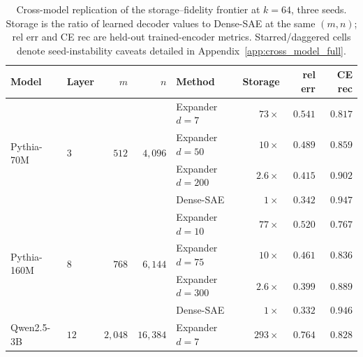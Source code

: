 \documentclass{article}
\theoremstyle{plain}
\theoremstyle{definition}
\theoremstyle{remark}
\begin{document}
\begin{table}[h]
    \centering
    \caption{Cross-model replication of the storage--fidelity frontier at $k{=}64$, three seeds. Storage is the ratio of learned decoder values to Dense-SAE at the same $(m,n)$; rel err and CE rec are held-out trained-encoder metrics. Starred/daggered cells denote seed-instability caveats detailed in Appendix~\ref{app:cross_model_full}.}
    \label{tab:cross_model}
    \small
    \setlength{\tabcolsep}{4pt}
    \begin{tabular}{llrrlrrr}
        \toprule
        Model & Layer & $m$ & $n$ & Method & Storage & rel err & CE rec \\
        \midrule
        \multirow{4}{*}{Pythia-70M}   & \multirow{4}{*}{$3$}  & \multirow{4}{*}{$512$}  & \multirow{4}{*}{$4{,}096$}    & Expander $d{=}7$    & $73\times$  & $0.541$        & $0.817$ \\
                                      &                       &                         &                                & Expander $d{=}50$   & $10\times$  & $0.489$        & $0.859$ \\
                                      &                       &                         &                                & Expander $d{=}200$  & $2.6\times$ & $0.415$        & $0.902$ \\
                                      &                       &                         &                                & Dense-SAE           & $1\times$   & $0.342$        & $0.947$ \\
        \midrule
        \multirow{4}{*}{Pythia-160M}  & \multirow{4}{*}{$8$}  & \multirow{4}{*}{$768$}  & \multirow{4}{*}{$6{,}144$}    & Expander $d{=}10$   & $77\times$  & $0.520$        & $0.767$ \\
                                      &                       &                         &                                & Expander $d{=}75$   & $10\times$  & $0.461$        & $0.836$ \\
                                      &                       &                         &                                & Expander $d{=}300$  & $2.6\times$ & $0.399$        & $0.889$ \\
                                      &                       &                         &                                & Dense-SAE           & $1\times$   & $0.332$        & $0.946$ \\
        \midrule
        \multirow{4}{*}{Qwen2.5-3B}   & \multirow{4}{*}{$12$} & \multirow{4}{*}{$2{,}048$} & \multirow{4}{*}{$16{,}384$} & Expander $d{=}7$    & $293\times$ & $0.764$        & $0.828$ \\

\end{tabular}
\end{table}
\end{document}
